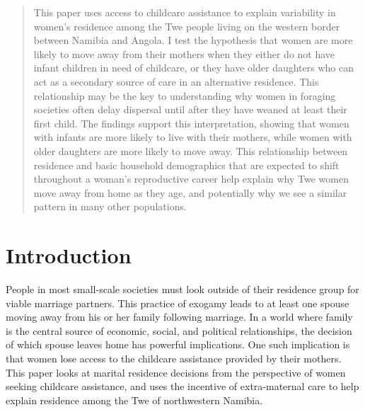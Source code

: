 \documentclass[10pt]{article}
\begin{document}
\maketitle

\begin{abstract}         %
This paper uses access to childcare assistance to explain variability in women's residence among the Twe people living on the western border between Namibia and Angola.  I test the hypothesis that women are more likely to move away from their mothers when they either do not have infant children in need of childcare, or they have older daughters who can act as a secondary source of care in an alternative residence.  This relationship may be the key to understanding why women in foraging societies often delay dispersal until after they have weaned at least their first child.  The findings support this interpretation, showing that women with infants are more likely to live with their mothers, while women with older daughters are more likely to move away.  This relationship between residence and basic household demographics that are expected to shift throughout a woman's reproductive career help explain why Twe women move away from home as they age, and potentially why we see a similar pattern in many other populations.


\end{abstract}               %

\bigskip

\modulolinenumbers[5]
\linenumbers

\section{Introduction}

People in most small-scale societies must look outside of their residence group for viable marriage partners.  This practice of exogamy leads to at least one spouse moving away from his or her family following marriage.  In a world where family is the central source of economic, social, and political relationships, the decision of which spouse leaves home has powerful implications.  One such implication is that women lose access to the childcare assistance provided by their mothers.  This paper looks at marital residence decisions from the perspective of women seeking childcare assistance, and uses the incentive of extra-maternal care to help explain residence among the Twe of northwestern Namibia.
\end{document}
